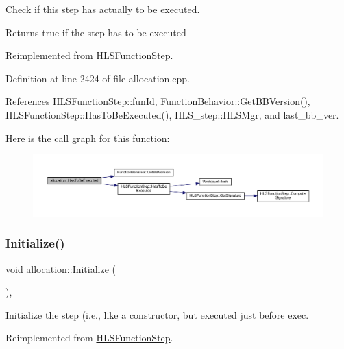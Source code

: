 Check if this step has actually to be executed. 

\begin{DoxyReturn}{Returns}
true if the step has to be executed 
\end{DoxyReturn}


Reimplemented from \hyperlink{classHLSFunctionStep_ac70d2df8fd475639bf9b5c8d492b2d62}{H\+L\+S\+Function\+Step}.



Definition at line 2424 of file allocation.\+cpp.



References H\+L\+S\+Function\+Step\+::fun\+Id, Function\+Behavior\+::\+Get\+B\+B\+Version(), H\+L\+S\+Function\+Step\+::\+Has\+To\+Be\+Executed(), H\+L\+S\+\_\+step\+::\+H\+L\+S\+Mgr, and last\+\_\+bb\+\_\+ver.

Here is the call graph for this function\+:
\nopagebreak
\begin{figure}[H]
\begin{center}
\leavevmode
\includegraphics[width=350pt]{d0/d74/classallocation_af29b72851d7c54b1b6ea0b60daa162de_cgraph}
\end{center}
\end{figure}
\mbox{\label{classallocation_a448e4e0cc7e3444fb3479f211d0b637e}} 
\subsubsection{\texorpdfstring{Initialize()}{Initialize()}}
{\footnotesize\ttfamily void allocation\+::\+Initialize (\begin{DoxyParamCaption}{ }\end{DoxyParamCaption})\hspace{0.3cm}{\ttfamily [override]}, {\ttfamily [virtual]}}



Initialize the step (i.\+e., like a constructor, but executed just before exec. 



Reimplemented from \hyperlink{classHLSFunctionStep_a966629ba62a8188ff4fa783ab0d4e319}{H\+L\+S\+Function\+Step}.



